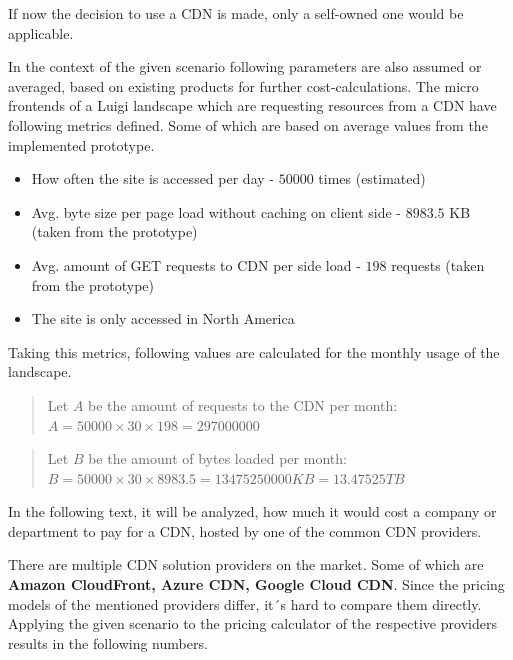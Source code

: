 If now the decision to use a CDN is made, only a self-owned one would be applicable.

In the context of the given scenario following parameters are also assumed or averaged, based on existing products for further cost-calculations.
The micro frontends of a Luigi landscape which are requesting resources from a CDN have following metrics defined. Some of which are based on average values from the implemented prototype.

\begin{itemize}[noitemsep]
	\item How often the site is accessed per day - $50 000$ times (estimated)
	\item Avg. byte size per page load without caching on client side - $8983.5$ KB (taken from the prototype)
	\item Avg. amount of GET requests to CDN per side load - $198$ requests (taken from the prototype)
	\item The site is only accessed in North America 
\end{itemize} 

Taking this metrics, following values are calculated for the monthly usage of the landscape.

\begin{quote}
	\begin{center}
		Let $A$ be the amount of requests to the CDN per month:
		\begin{math}
			A = 50000 \times 30 \times 198 = 297000000
		\end{math}
	\end{center} 
\end{quote}

\begin{quote}
	\begin{center}
		Let $B$ be the amount of bytes loaded per month:
		\begin{math}
			B = 50000 \times 30 \times 8983.5 = 13475250000 KB = 13.47525 TB
		\end{math}
	\end{center} 
\end{quote}

In the following text, it will be analyzed, how much it would cost a company or department to pay for a CDN, hosted by one of the common CDN providers. 

There are multiple CDN solution providers on the market. Some of which are \textbf{Amazon CloudFront, Azure CDN, Google Cloud CDN}. \cite{top_10_cdn}
Since the pricing models of the mentioned providers differ, it´s hard to compare them directly. Applying the given scenario to the pricing calculator of the respective providers results in the following numbers.

